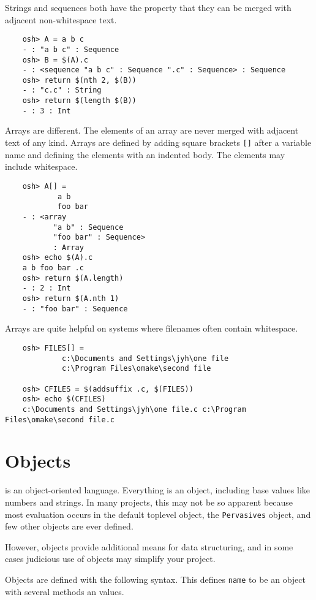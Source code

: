 Strings and sequences both have the property that they can be merged
with adjacent non-whitespace text.

\begin{verbatim}
    osh> A = a b c
    - : "a b c" : Sequence
    osh> B = $(A).c
    - : <sequence "a b c" : Sequence ".c" : Sequence> : Sequence
    osh> return $(nth 2, $(B))
    - : "c.c" : String
    osh> return $(length $(B))
    - : 3 : Int
\end{verbatim}

Arrays are different.  The elements of an array are never merged with
adjacent text of any kind.  Arrays are defined by adding square
brackets \verb+[]+ after a variable name and defining the elements
with an indented body.  The elements may include whitespace.

\begin{verbatim}
    osh> A[] =
            a b
            foo bar
    - : <array
           "a b" : Sequence
           "foo bar" : Sequence>
           : Array
    osh> echo $(A).c
    a b foo bar .c
    osh> return $(A.length)
    - : 2 : Int
    osh> return $(A.nth 1)
    - : "foo bar" : Sequence
\end{verbatim}

Arrays are quite helpful on systems where filenames often contain whitespace.

\begin{verbatim}
    osh> FILES[] =
             c:\Documents and Settings\jyh\one file
             c:\Program Files\omake\second file

    osh> CFILES = $(addsuffix .c, $(FILES))
    osh> echo $(CFILES)
    c:\Documents and Settings\jyh\one file.c c:\Program Files\omake\second file.c
\end{verbatim}

\section{Objects}

 is an object-oriented language.  Everything is an object, including
base values like numbers and strings.  In many projects, this may not be so apparent
because most evaluation occurs in the default toplevel object, the \verb+Pervasives+
object, and few other objects are ever defined.

However, objects provide additional means for data structuring, and in some cases
judicious use of objects may simplify your project.

Objects are defined with the following syntax.  This defines \verb+name+
to be an object with several methods an values.

